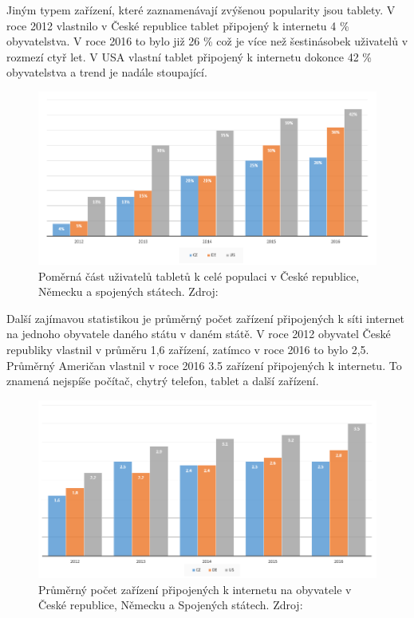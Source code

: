 Jiným typem zařízení, které zaznamenávají zvýšenou popularity jsou tablety. V roce 2012 vlastnilo v České republice tablet připojený k internetu 4 \% obyvatelstva. V roce 2016 to bylo již 26 \% což je více než šestinásobek uživatelů v rozmezí ctyř let. V USA vlastní tablet připojený k internetu dokonce 42 \% obyvatelstva a trend je nadále stoupající. 

\begin{figure}[h!]\label{uzivateleTablet}
\centering
\includegraphics[width=13cm]{img/uzivateleTablet}
\caption{Poměrná část uživatelů tabletů k celé populaci v České republice, Německu a spojených státech. Zdroj: } 
\end{figure}

Další zajímavou statistikou je průměrný počet zařízení připojených k síti internet na jednoho obyvatele daného státu v daném státě. V roce 2012 obyvatel České republiky vlastnil v průměru 1,6 zařízení, zatímco v roce 2016 to bylo 2,5. Průměrný Američan vlastnil v roce 2016 3.5 zařízení připojených k internetu. To znamená nejspíše počítač, chytrý telefon, tablet a další zařízení.

\begin{figure}[h!]\label{pocetZarizeni}
\centering
\includegraphics[width=13cm]{img/pocetZarizeni}
\caption{Průměrný počet zařízení připojených k internetu na obyvatele v České republice, Německu a Spojených státech. Zdroj: } 
\end{figure}

